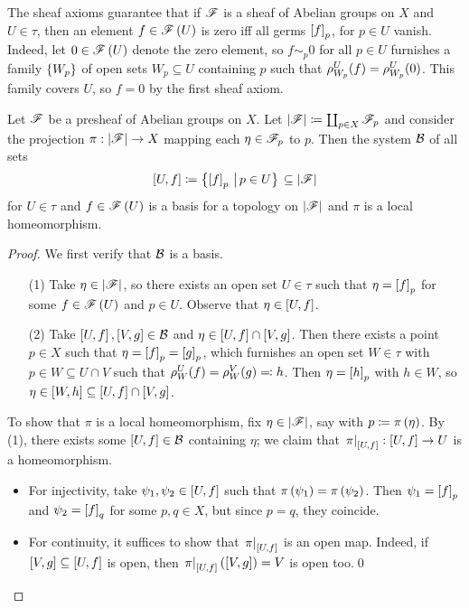 \documentclass[../Moduli_Spaces_of_Riemann_Surfaces.tex]{subfiles}
\begin{document}
    \begin{remark}
        The sheaf axioms guarantee that if $\mathscr{F}$ is a sheaf of Abelian groups on $X$ and $U\in\tau$, then an element $f\in\mathscr{F}\left(U\right)$ is zero iff all germs $\left[f\right]_p$, for $p\in U$ vanish. Indeed, let $0\in\mathscr{F}\left(U\right)$ denote the zero element, so $f\sim_p0$ for all $p\in U$ furnishes a family $\left\{W_p\right\}$ of open sets $W_p\subseteq U$ containing $p$ such that $\rho^U_{W_p}\!\left(f\right)=\rho^U_{W_p}\!\left(0\right)$. This family covers $U$, so $f=0$ by the first sheaf axiom.\exqed
    \end{remark}
    \begin{proposition}\label{2.2:prp:basis_stalk}
        Let $\mathscr{F}$ be a presheaf of Abelian groups on $X$. Let $\left|\mathscr{F}\right|\coloneqq\coprod_{p\in X}\mathscr{F}_p$ and consider the projection $\pi:\left|\mathscr{F}\right|\to X$ mapping each $\eta\in\mathscr{F}_p$ to $p$. Then the system $\mathcal{B}$ of all sets
        \begin{equation*}
            \left[U,f\right]\coloneqq\bigl\{\left[f\right]_p\,\left|\,p\in U\bigr\}\right.\subseteq\left|\mathscr{F}\right|
        \end{equation*}
        for $U\in\tau$ and $f\in\mathscr{F}\left(U\right)$ is a basis for a topology on $\left|\mathscr{F}\right|$ and $\pi$ is a local homeomorphism.
    \end{proposition}
    \begin{proof}
        We first verify that $\mathcal{B}$ is a basis.
        \begin{enumerate}
            \item[(1)] Take $\eta\in\left|\mathscr{F}\right|$, so there exists an open set $U\in\tau$ such that $\eta=\left[f\right]_p$ for some $f\in\mathscr{F}\left(U\right)$ and $p\in U$. Observe that $\eta\in\left[U,f\right]$.
            \item[(2)] Take $\left[U,f\right],\left[V,g\right]\in\mathcal{B}$ and $\eta\in\left[U,f\right]\cap\left[V,g\right]$. Then there exists a point $p\in X$ such that $\eta=\left[f\right]_p=\left[g\right]_p$, which furnishes an open set $W\in\tau$ with $p\in W\subseteq U\cap V$ such that $\rho^U_W\!\left(f\right)=\rho^V_W\!\left(g\right)\eqqcolon h$. Then $\eta=\left[h\right]_p$ with $h\in W$, so $\eta\in\left[W,h\right]\subseteq\left[U,f\right]\cap\left[V,g\right]$.
        \end{enumerate}
        To show that $\pi$ is a local homeomorphism, fix $\eta\in\left|\mathscr{F}\right|$, say with $p\coloneqq\pi\left(\eta\right)$. By (1), there exists some $\left[U,f\right]\in\mathcal{B}$ containing $\eta$; we claim that $\left.\pi\right|_{\left[U,f\right]}:\left[U,f\right]\to U$ is a homeomorphism.
        \begin{itemize}
            \item For injectivity, take $\psi_1,\psi_2\in\left[U,f\right]$ such that $\pi\left(\psi_1\right)=\pi\left(\psi_2\right)$. Then $\psi_1=\left[f\right]_p$ and $\psi_2=\left[f\right]_q$ for some $p,q\in X$, but since $p=q$, they coincide.
            \item For continuity, it suffices to show that $\left.\pi\right|_{\left[U,f\right]}$ is an open map. Indeed, if $\left[V,g\right]\subseteq\left[U,f\right]$ is open, then $\left.\pi\right|_{\left[U,f\right]}\left(\left[V,g\right]\right)=V$ is open too.\qed
        \end{itemize}
    \end{proof}
\end{document}
